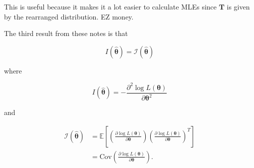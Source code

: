 This is useful because it makes it a lot easier to calculate MLEs since \(\bm{T}\) is given by the rearranged distribution. EZ money. 

\bigskip

The third result from these notes is that 

\begin{equation}\label{eq:reg exp fam stuff 3}
    I(\hat{\bm{\theta}}) = \mathscr{I}(\hat{\bm{\theta}})
\end{equation}

where 

\begin{equation}\label{eq:reg exp fam stuff 3.1}
    I(\hat{\bm{\theta}}) = -\frac{\partial^2 \log{L(\bm{\theta})}}{\partial\bm{\theta}^2}
\end{equation}

and

\begin{equation}\label{eq:reg exp fam stuff 3.2}
    \begin{split}
        \mathscr{I}(\hat{\bm{\theta}}) &= \mathbb{E} \left[ \left(\frac{\partial \log{L(\bm{\theta})}}{\partial\bm{\theta}}\right)  \left(\frac{\partial \log{L(\bm{\theta})}}{\partial\bm{\theta}}\right)^T \right]\\
        &= \text{Cov}\left(\frac{\partial \log{L(\bm{\theta})}}{\partial\bm{\theta}}\right).
    \end{split}
\end{equation}